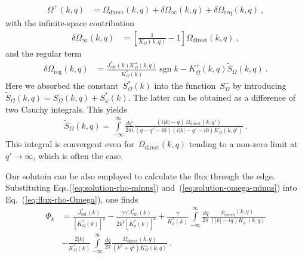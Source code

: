 \documentclass[preprint,aps,eqsecnum]{revtex4-1}
\newcommand{\fplus}[1]{{#1}^{+}}
\newcommand{\fminus}[1]{{#1}^{-}}
\newcommand{\sgn}{\mathop{\mathrm{sgn}}\nolimits}
\newcommand{\dct}[1]{{#1}_\mathrm{direct}}
\begin{document}
\begin{align}
  \label{eq:solution-omega-plus}
  \fplus{\Omega}(k, q) &= \dct{\Omega}(k, q)
                           + \delta\Omega_{\infty}(k, q)
                           + \delta\Omega_\mathrm{req}(k, q)\ ,
\end{align}
with the infinite-space contribution
\begin{align}
  \delta\Omega_\mathrm{\infty}(k, q) &=
        \left[\frac{1}{K_\Omega(k, q)} - 1 \right] \dct{\Omega}(k, q)\ ,
\end{align}
and the regular term
\begin{align}
  \delta\Omega_\mathrm{reg}(k, q) &=
  \frac{J_\mathrm{ext}^\ast(k) \fplus{K}_\Omega(k, q)}{K_\Omega^\ast(k)}
                                    \sgn{k}
  - \fplus{K}_\Omega(k, q) {\tilde S}_\Omega(k, q)
  \ .
\end{align}
Here we absorbed the constant~$S_\Omega^\ast(k)$
into the function~$\fminus{S}_\Omega$ by introducing
${\tilde S}_\Omega(k, q) = \fminus{S}_\Omega(k, q) + S_\omega^\ast(k)$.
The latter can be obtained as a difference of  two  Cauchy integrals.
This yields
\begin{align}
  \label{eq:solution-psi}
  {\tilde{S}}_\Omega(k, q) = \int\limits_{-\infty}^{\infty}
  \frac{dq'}{2\pi i} \frac{(i|k| - q) \,
  \dct{\Omega}(k, q')}{(q - q' - i0)(i|k| - q' - i0) \fminus{K}_\Omega(k, q')}
  \ .
\end{align}
This integral is convergent even for~$\dct{\Omega}(k, q)$
tending to a non-zero limit at~$q'\to \infty$, which is often the case. 

Our solutoin 
can be also  employed to calculate the flux through the edge. Substituting
Eqs.(\ref{eq:solution-rho-minus}) and~(\ref{eq:solution-omega-minus})
into Eq.~(\ref{eq:flux-rho-Omega}),
one finds
\begin{align}
  \label{eq:phi-general}
  \Phi_k &= \frac{J_\mathrm{ext}^\ast(k)}{\left[K_\Omega^\ast(k)\right]^2}
  - \frac{\gamma \gamma' J_\mathrm{ext}^\ast(k)}{2k^2 \left[K_\rho^\ast(k)\right]^2}
  + \frac{\gamma}{K_\rho^\ast(k)} \int\limits_{-\infty}^{\infty}
    \frac{dq}{2\pi}
  \frac{\dct{\rho}(k, q)}{(|k| - i q) \fminus{K}_\rho(k, q)}
  \nonumber
  \\
   &- \frac{2|k|}{K_\Omega^\ast(k)} \int\limits_{-\infty}^{\infty}
     \frac{dq}{2\pi}
     \frac{\dct{\Omega}(k, q)}{(k^2 + q^2)\fminus{K}_\Omega(k, q)}
    \ .
\end{align}
\end{document}

